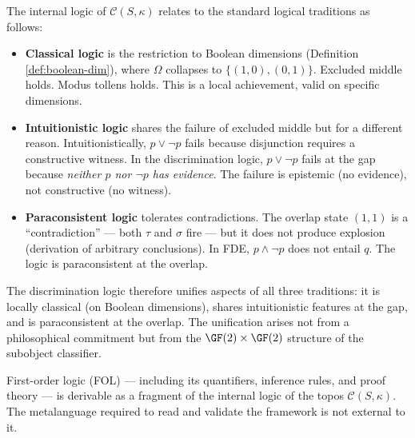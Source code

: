 \begin{remark}
The internal logic of $\mathcal{C}(S,\kappa)$ relates to
the standard logical traditions as follows:
\begin{itemize}[nosep]
  \item \textbf{Classical logic} is the restriction to
    Boolean dimensions (Definition \ref{def:boolean-dim}),
    where $\Omega$ collapses to $\{(1,0), (0,1)\}$.
    Excluded middle holds. Modus tollens holds. This is a
    local achievement, valid on specific dimensions.
  \item \textbf{Intuitionistic logic} shares the failure of
    excluded middle but for a different reason.
    Intuitionistically, $p \vee \neg p$ fails because
    disjunction requires a constructive witness.
    In the discrimination logic, $p \vee \neg p$ fails at
    the gap because \emph{neither $p$ nor $\neg p$ has
    evidence}. The failure is epistemic (no evidence),
    not constructive (no witness).
  \item \textbf{Paraconsistent logic} tolerates
    contradictions. The overlap state $(1,1)$ is a
    ``contradiction'' --- both $\tau$ and $\sigma$ fire
    --- but it does not produce explosion (derivation of
    arbitrary conclusions). In FDE, $p \wedge \neg p$ does
    not entail $q$. The logic is paraconsistent at the
    overlap.
\end{itemize}
The discrimination logic therefore unifies aspects of
all three traditions: it is locally classical (on Boolean
dimensions), shares intuitionistic features at the gap,
and is paraconsistent at the overlap. The unification
arises not from a philosophical commitment but from the
$\GF(2) \times \GF(2)$ structure of the subobject
classifier.
\end{remark}

\begin{proposition}
\label{prop:fol}
First-order logic (FOL) --- including its quantifiers,
inference rules, and proof theory --- is derivable as a
fragment of the internal logic of the topos
$\mathcal{C}(S,\kappa)$. The metalanguage required to
read and validate the framework is not external to it.
\end{proposition}

